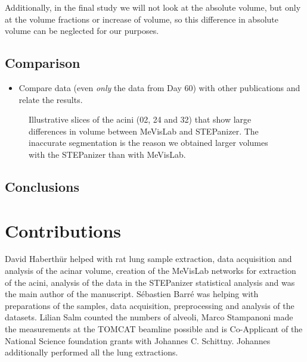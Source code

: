 \documentclass[%
	paper=a4,%
	abstract=true,%
	]{scrartcl}
\newcommand{\imsize}{\linewidth}
\begin{document}
Additionally, in the final study we will not look at the absolute volume, but only at the volume fractions or increase of volume, so this difference in absolute volume can be neglected for our purposes.

\subsection{Comparison}
\begin{itemize}
	\item Compare data (even \emph{only} the data from Day 60) with other publications and relate the results.
\end{itemize} 

\renewcommand{\imsize}{0.33\linewidth}%
\setlength\fboxsep{0pt}%
\begin{figure}[htb]
	\centering
	\hfill%
	\hfill%
	\caption{Illustrative slices of the acini (02, 24 and 32) that show large differences in volume between MeVisLab and STEPanizer. The inaccurate segmentation is the reason we obtained larger volumes with the STEPanizer than with MeVisLab.}
	\label{fig:MeVisSegmentation}
\end{figure}

\subsection{Conclusions}

\section{Contributions}
David Haberthür helped with rat lung sample extraction, data acquisition and analysis of the acinar volume, creation of the MeVisLab networks for extraction of the acini, analysis of the data in the STEPanizer statistical analysis and was the main author of the manuscript.  Sébastien Barré was helping with preparations of the samples, data acquisition, preprocessing and analysis of the datasets. Lilian Salm counted the numbers of alveoli, Marco Stampanoni made the measurements at the TOMCAT beamline possible and is Co-Applicant of the National Science foundation grants with Johannes C. Schittny. Johannes additionally performed all the lung extractions.
\end{document}
